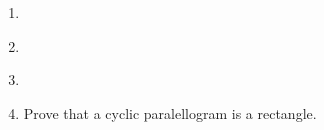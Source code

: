 \begin{enumerate}[label=\thesection.\arabic*,ref=\thesection.\theenumi]
\item 
\label{chapters/9/10/5/1}


\item 
\item 
\label{chapters/9/10/5/3}

    \item Prove that a cyclic paralellogram is a rectangle.
\label{chapters/9/10/5/12}
\\
\solution


\end{enumerate}
